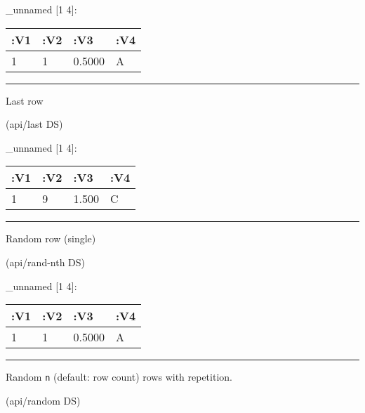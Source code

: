 \documentclass[]{article}
\newenvironment{Shaded}{\begin{snugshade}}{\end{snugshade}}
\newcommand{\NormalTok}[1]{#1}
\begin{document}
\_unnamed {[}1 4{]}:

\begin{longtable}[]{@{}llll@{}}
\toprule
:V1 & :V2 & :V3 & :V4\tabularnewline
\midrule
\endhead
1 & 1 & 0.5000 & A\tabularnewline
\bottomrule
\end{longtable}

\begin{center}\rule{0.5\linewidth}{0.5pt}\end{center}

Last row

\begin{Shaded}
\begin{Highlighting}[]
\NormalTok{(api/last DS)}
\end{Highlighting}
\end{Shaded}

\_unnamed {[}1 4{]}:

\begin{longtable}[]{@{}llll@{}}
\toprule
:V1 & :V2 & :V3 & :V4\tabularnewline
\midrule
\endhead
1 & 9 & 1.500 & C\tabularnewline
\bottomrule
\end{longtable}

\begin{center}\rule{0.5\linewidth}{0.5pt}\end{center}

Random row (single)

\begin{Shaded}
\begin{Highlighting}[]
\NormalTok{(api/rand-nth DS)}
\end{Highlighting}
\end{Shaded}

\_unnamed {[}1 4{]}:

\begin{longtable}[]{@{}llll@{}}
\toprule
:V1 & :V2 & :V3 & :V4\tabularnewline
\midrule
\endhead
1 & 1 & 0.5000 & A\tabularnewline
\bottomrule
\end{longtable}

\begin{center}\rule{0.5\linewidth}{0.5pt}\end{center}

Random \texttt{n} (default: row count) rows with repetition.

\begin{Shaded}
\begin{Highlighting}[]
\NormalTok{(api/random DS)}
\end{Highlighting}
\end{Shaded}
\end{document}
